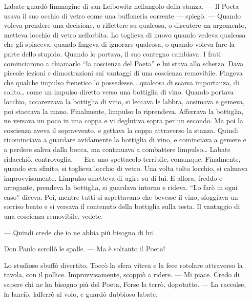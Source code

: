 L\textquotesingle abate guardò l\textquotesingle immagine di san
Leibowitz nell\textquotesingle angolo della stanza. --- Il Poeta usava
il suo occhio di vetro come una buffoneria corrente --- spiegò. ---
Quando voleva prendere una decisione, o riflettere su qualcosa, o
discutere un argomento, metteva l\textquotesingle occhio di vetro
nell\textquotesingle orbita. Lo toglieva di nuovo quando vedeva qualcosa
che gli spiaceva, quando fingeva di ignorare qualcosa, o quando voleva
fare la parte dello stupido. Quando lo portava, il suo contegno
cambiava. I frati cominciarono a chiamarlo ``la coscienza del Poeta'' e
lui stava allo scherzo. Dava piccole lezioni e dimostrazioni sui
vantaggi di una coscienza removibile. Fingeva che qualche impulso
frenetico lo possedesse\ldots{} qualcosa di scarsa importanza, di
solito\ldots{} come un impulso diretto verso una bottiglia di vino.
Quando portava l\textquotesingle occhio, accarezzava la bottiglia di
vino, si leccava le labbra, ansimava e gemeva, poi staccava la mano.
Finalmente, l\textquotesingle impulso lo riprendeva. Afferrava la
bottiglia, ne versava un poco in una coppa e vi deglutiva sopra per un
secondo. Ma poi la coscienza aveva il sopravvento, e gettava la coppa
attraverso la stanza. Quindi ricominciava a guardare avidamente la
bottiglia di vino, e cominciava a gemere e a perdere saliva dalla bocca,
ma continuava a combattere l\textquotesingle impulso\ldots{}
L\textquotesingle abate ridacchiò, controvoglia. --- Era uno spettacolo
terribile, comunque. Finalmente, quando era sfinito, si toglieva
l\textquotesingle occhio di vetro. Una volta tolto
l\textquotesingle occhio, si calmava improvvisamente.
L\textquotesingle impulso smetteva di agire su di lui. E allora, freddo
e arrogante, prendeva la bottiglia, si guardava intorno e rideva. ``Lo
farò in ogni caso'' diceva. Poi, mentre tutti si aspettavano che bevesse
il vino, sfoggiava un sorriso beato e si versava il contenuto della
bottiglia sulla testa. Il vantaggio di una coscienza removibile, vedete.

--- Quindi crede che io ne abbia più bisogno di lui.

Don Paulo scrollò le spalle. --- Ma è soltanto il Poeta!

Lo studioso sbuffò divertito. Toccò la sfera vitrea e la fece rotolare
attraverso la tavola, con il pollice. Improvvisamente, scoppiò a ridere.
--- Mi piace. Credo di sapere chi ne ha bisogno più del Poeta, Forse la
terrò, dopotutto. --- La raccolse, la lanciò, l\textquotesingle afferrò
al volo, e guardò dubbioso l\textquotesingle abate.

